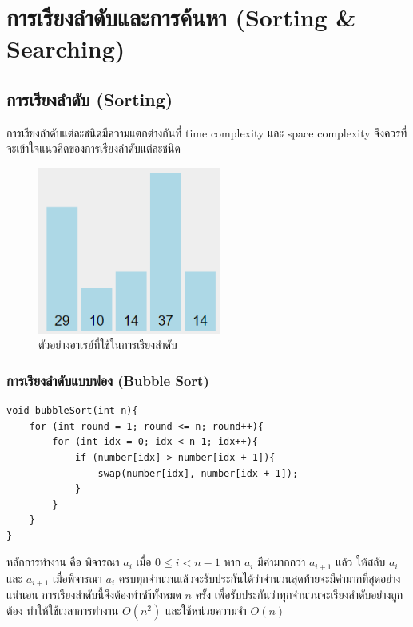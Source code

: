 \chapter{การเรียงลำดับและการค้นหา (Sorting \& Searching)}
\section{การเรียงลำดับ (Sorting)}

การเรียงลำดับแต่ละชนิดมีความแตกต่างกันที่ time complexity และ space complexity จึงควรที่จะเข้าใจแนวคิดของการเรียงลำดับแต่ละชนิด

\begin{figure}[h!]
	\centering
	\includegraphics[width=6cm]{images/bubble_sort_start}
	\caption{ตัวอย่างอาเรย์ที่ใช้ในการเรียงลำดับ}
    \label{fig:bubble_sort_start}
\end{figure}

\subsection{การเรียงลำดับแบบฟอง (Bubble Sort)}

\begin{lstlisting}
void bubbleSort(int n){
	for (int round = 1; round <= n; round++){
		for (int idx = 0; idx < n-1; idx++){
			if (number[idx] > number[idx + 1]){
				swap(number[idx], number[idx + 1]);
			}
		}
	}
}
\end{lstlisting}

หลักการทำงาน คือ พิจารณา $a_i$ เมื่อ $0 \leq i < n-1$ หาก $a_i$ มีค่ามากกว่า $a_{i+1}$ แล้ว ให้สลับ $a_i$ และ  $a_{i+1}$ เมื่อพิจารณา $a_i$ ครบทุกจำนวนแล้วจะรับประกันได้ว่าจำนวนสุดท้ายจะมีค่ามากที่สุดอย่างแน่นอน การเรียงลำดับนี้จึงต้องทำซำ้ทั้งหมด $n$ ครั้ง เพื่อรับประกันว่าทุกจำนวนจะเรียงลำดับอย่างถูกต้อง ทำให้ใช้เวลาการทำงาน $O(n^2)$ และใช้หน่วยความจำ $O(n)$

